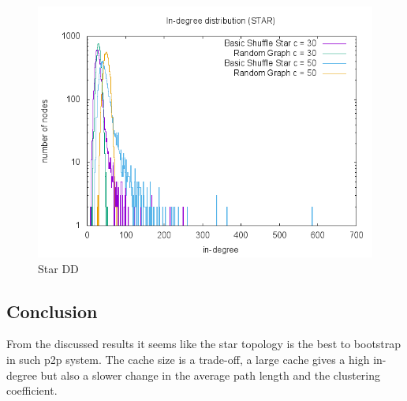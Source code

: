 \documentclass[UKenglish]{article}  %
\begin{document}
\begin{figure}
\includegraphics[scale=0.6]{plot/starDD.png}
	\caption{Star DD}
	\label{fig:starDD}
\end{figure}

\subsection{Conclusion}
From the discussed results it seems like the star topology is the best to bootstrap in such p2p system. The cache size is a trade-off, a large cache gives a high in-degree but also a slower change in the average path length and the clustering coefficient. 
\end{document}
